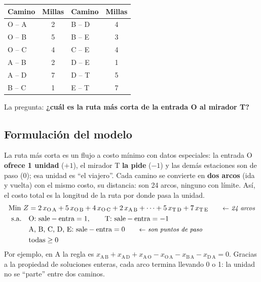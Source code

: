 \documentclass[11pt,a4paper]{article}
\newcommand{\x}[2]{x_{\mathrm{#1}\,\mathrm{#2}}}
\begin{document}
\noindent
\begin{minipage}[c]{0.38\textwidth}\small\centering
\begin{tabular}{lc@{\quad}lc}
\toprule
\textbf{Camino} & \textbf{Millas} & \textbf{Camino} & \textbf{Millas} \\
\midrule
O -- A & 2 & B -- D & 4 \\
O -- B & 5 & B -- E & 3 \\
O -- C & 4 & C -- E & 4 \\
A -- B & 2 & D -- E & 1 \\
A -- D & 7 & D -- T & 5 \\
B -- C & 1 & E -- T & 7 \\
\bottomrule
\end{tabular}
\end{minipage}\hfill
\begin{minipage}[c]{0.60\textwidth}\centering
{}
\end{minipage}

\medskip
La pregunta: \textbf{¿cuál es la ruta más corta de la entrada O al mirador T?}

\subsection*{Formulación del modelo}
La ruta más corta es un flujo a costo mínimo con datos especiales: la entrada O \textbf{ofrece 1 unidad} ($+1$), el
mirador T \textbf{la pide} ($-1$) y las demás estaciones son de paso (0); esa unidad es ``el viajero''. Cada camino se
convierte en \textbf{dos arcos} (ida y vuelta) con el mismo costo, su distancia: son 24 arcos, ninguno con límite. Así,
el costo total es la longitud de la ruta por donde pasa la unidad.
\[
\begin{aligned}
\text{Min } Z &= 2\,\x{O}{A} + 5\,\x{O}{B} + 4\,\x{O}{C} + 2\,\x{A}{B} + \dots + 5\,\x{T}{D} + 7\,\x{T}{E} \nota{24 arcos}\\
\text{s.a.}\quad & \text{O: sale} - \text{entra} = 1, \qquad \text{T: sale} - \text{entra} = -1\\
& \text{A, B, C, D, E: sale} - \text{entra} = 0 \nota{son puntos de paso}\\
& \text{todas} \ge 0
\end{aligned}
\]
Por ejemplo, en A la regla es $\x{A}{B} + \x{A}{D} + \x{A}{O} - \x{O}{A} - \x{B}{A} - \x{D}{A} = 0$.
Gracias a la propiedad de soluciones enteras, cada arco termina llevando 0 o 1: la unidad no se ``parte'' entre dos caminos.
\end{document}
